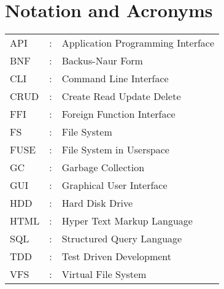 \chapter*{Notation and Acronyms}
\vspace{1cm}

\noindent
\begin{tabular}{lcl}
    API &: & Application Programming Interface \\
    BNF &: & Backus-Naur Form \\
    CLI &: & Command Line Interface \\
    CRUD &: & Create Read Update Delete \\
    FFI &: & Foreign Function Interface \\
    FS &: & File System \\
    FUSE &: & File System in Userspace \\
    GC &: & Garbage Collection \\
    GUI &: & Graphical User Interface \\
    HDD &: & Hard Disk Drive \\
    HTML &: & Hyper Text Markup Language \\
    SQL &: & Structured Query Language \\
    TDD &: & Test Driven Development \\
    VFS &: & Virtual File System \\
\end{tabular}
